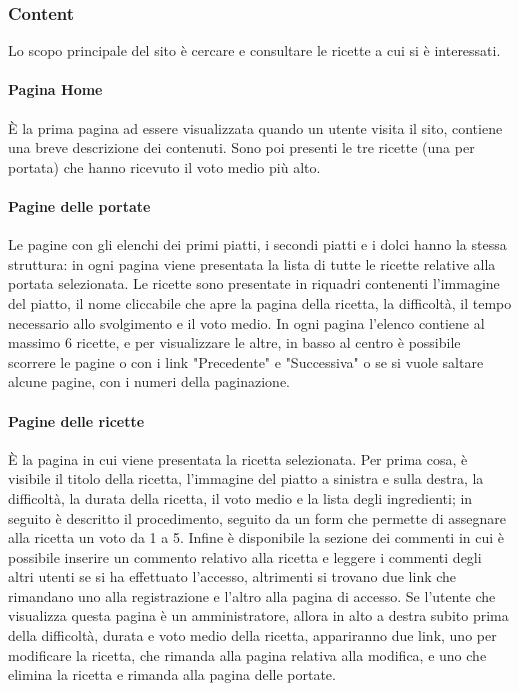 \subsubsection{Content}
\label{ssub:content}
Lo scopo principale del sito è cercare e consultare le ricette a cui si è interessati.

\paragraph{Pagina Home}
È la prima pagina ad essere visualizzata quando un utente visita il sito, contiene una breve descrizione dei contenuti.
Sono poi presenti le tre ricette (una per portata) che hanno ricevuto il voto medio più alto.

\paragraph{Pagine delle portate}
Le pagine con gli elenchi dei primi piatti, i secondi piatti e i dolci hanno la stessa struttura: in ogni pagina viene presentata la lista di tutte le ricette relative alla portata selezionata. Le ricette sono presentate in riquadri contenenti l'immagine del piatto, il nome cliccabile che apre la pagina della ricetta, la difficoltà, il tempo necessario allo svolgimento e il voto medio. In ogni pagina l'elenco contiene al massimo 6 ricette, e per visualizzare le altre, in basso al centro è possibile scorrere le pagine o con i link "Precedente" e "Successiva" o se si vuole saltare alcune pagine, con i numeri della paginazione.

\paragraph{Pagine delle ricette}
È la pagina in cui viene presentata la ricetta selezionata. Per prima cosa, è visibile il titolo della ricetta, l'immagine del piatto a sinistra e sulla destra, la difficoltà, la durata della ricetta, il voto medio e la lista degli ingredienti; in seguito è descritto il procedimento, seguito da un form che permette di assegnare alla ricetta un voto da 1 a 5. Infine è disponibile la sezione dei commenti in cui è possibile inserire un commento relativo alla ricetta e leggere i commenti degli altri utenti se si ha effettuato l'accesso, altrimenti si trovano due link che rimandano uno alla registrazione e l'altro alla pagina di accesso. Se l'utente che visualizza questa pagina è un amministratore, allora in alto a destra subito prima della difficoltà, durata e voto medio della ricetta, appariranno due link, uno per modificare la ricetta, che rimanda alla pagina relativa alla modifica, e uno che elimina la ricetta e rimanda alla pagina delle portate.

